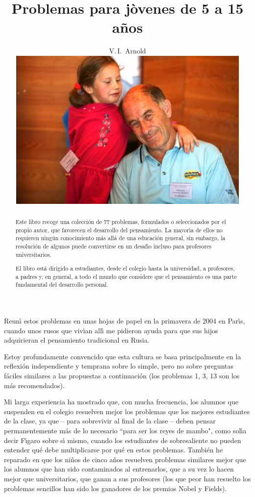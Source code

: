 \documentclass[12pt]{article}  %
\title{Problemas para j\`{o}venes de 5 a 15 a\~{n}os}
\author{V.\,I.~Arnold
\vspace*{2cm}\\ 
\includegraphics[width=12cm]{photo-arnold_small}
}
\date{}
\begin{document}
\def\eps{\varepsilon}
\maketitle
\thispagestyle{empty}

\newpage 
\setcounter{page}{1}
\begin{abstract}

Este libro recoge una colecci\'on de 77 problemas, formulados o seleccionados por el propio autor, 
que favorecen el desarrollo del pensamiento.
La mayor\'{\i}a de ellos no requieren ning\'un conocimiento m\'as all\'a de una educaci\'on general, 
sin embargo, la resoluci\'on de algunos puede convertirse en un desaf\'{\i}o incluso para profesores 
universitarios.

El libro est\'a dirigido a estudiantes, desde el colegio hasta la universidad, a profesores, 
a padres y, en general, a todo el mundo que considere que el pensamiento es una parte fundamental del desarrollo personal.
\end{abstract}

\newpage


Reun\'{\i} estos problemas en unas hojas de papel en la primavera de 2004 en Par\'{\i}s, cuando unos rusos 
que viv\'{\i}an all\'{\i} me pidieron ayuda para que sus hijos adquirieran el pensamiento tradicional en Rusia.

Estoy profundamente convencido que esta cultura se basa principalmente en la reflexi\'on independiente y
temprana sobre lo simple, pero no sobre preguntas f\'aciles similares a las propuestas a continuaci\'on 
(los problemas 1, 3, 13 son los m\'as recomendados).

Mi larga experiencia ha mostrado que, con mucha frecuencia, los alumnos que suspenden en el colegio 
resuelven mejor los problemas que los mejores estudiantes de la clase, ya que -- para sobrevivir al final
 de la clase -- deben pensar permanentemente m\'as de lo necesario ``para ser los reyes de mambo", 
 como sol\'{\i}a decir F\'{\i}garo sobre s\'{\i} mismo,
cuando los estudiantes de sobresaliente no pueden entender qu\'e debe multiplicarse por qu\'e en estos problemas.
Tambi\'en he reparado en que los ni\~nos de cinco a\~nos resuelven problemas similares mejor 
que los alumnos que han sido contaminados al entrenarlos, que a su vez lo hacen mejor que universitarios, 
que ganan a sus profesores (los que peor han resuelto los problemas sencillos han sido los ganadores de los premios 
Nobel y Fields).   

\ 
\end{document}
